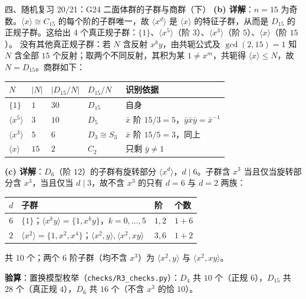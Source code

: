\documentclass[aspectratio=169,10pt,fontset=none]{ctexbeamer}
\newcommand{\key}[1]{\textcolor{ink}{\bfseries #1}}
\begin{document}
\begin{frame}[t]{四、随机复习 20/21：G24 二面体群的子群与商群（下）}
\scriptsize
\key{(b) 详解}：$n=15$ 为奇数。$\langle x\rangle\cong C_{15}$ 的每个阶的子群唯一，故 $\langle x^d\rangle$ 是 $\langle x\rangle$ 的特征子群，从而是 $D_{15}$ 的正规子群。这给出 $4$ 个真正规子群：$\{1\}$、$\langle x^5\rangle$（阶 $3$）、$\langle x^3\rangle$（阶 $5$）、$\langle x\rangle$（阶 $15$）。
没有其他真正规子群：若 $N$ 含反射 $x^ky$，由共轭公式及 $\gcd(2,15)=1$ 知 $N$ 含全部 $15$ 个反射；取两个不同反射，其积为某 $1\neq x^m$，共轭得 $\langle x\rangle\le N$，故 $N=D_{15}$。商群如下：
\begin{center}
{\scriptsize
\begin{tabular}{@{}lllll@{}}
\toprule
$N$ & $|N|$ & $|D_{15}/N|$ & $D_{15}/N$ & 识别依据\\
\midrule
$\{1\}$ & $1$ & $30$ & $D_{15}$ & 自身\\
$\langle x^5\rangle$ & $3$ & $10$ & $D_5$ & $\bar x$ 阶 $15/3=5$，$\bar y\bar x\bar y=\bar x^{-1}$\\
$\langle x^3\rangle$ & $5$ & $6$ & $D_3\cong S_3$ & $\bar x$ 阶 $15/5=3$，同上\\
$\langle x\rangle$ & $15$ & $2$ & $C_2$ & 只剩 $\bar y\neq1$\\
\bottomrule
\end{tabular}}
\end{center}
\key{(c) 详解}：$D_6$（阶 $12$）的子群有旋转部分 $\langle x^d\rangle$，$d\mid6$。子群含 $x^3$ 当且仅当旋转部分含 $x^3$，当且仅当 $d\mid3$，故不含 $x^3$ 的只有 $d=6$ 与 $d=2$ 两族：
\begin{center}
{\scriptsize
\begin{tabular}{@{}clll@{}}
\toprule
$d$ & 子群 & 阶 & 个数\\
\midrule
$6$ & $\{1\}$；$\langle x^ky\rangle=\{1,x^ky\}$，$k=0,\dots,5$ & $1,2$ & $1+6$\\
$2$ & $\langle x^2\rangle=\{1,x^2,x^4\}$；$\langle x^2,y\rangle,\langle x^2,xy\rangle$ & $3,6$ & $1+2$\\
\bottomrule
\end{tabular}}
\end{center}
共 $10$ 个；两个 $6$ 阶子群（均不含 $x^3$）为 $\langle x^2,y\rangle$ 与 $\langle x^2,xy\rangle$。

\key{验算}：置换模型枚举（\texttt{checks/R3\_checks.py}）：$D_4$ 共 $10$ 个（正规 $6$），$D_{15}$ 共 $28$ 个（真正规 $4$），$D_6$ 共 $16$ 个（不含 $x^3$ 的恰 $10$）。
\end{frame}
\end{document}
